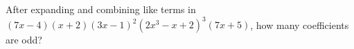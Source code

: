 After expanding and combining like terms in $(7x-4)(x+2)(3x-1)^2(2x^3-x+2)^3(7x+5)$, how many coefficients are odd?
